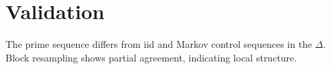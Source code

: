 \section{Validation}

The prime sequence differs from iid and Markov control sequences in the $\Delta$. Block resampling shows partial agreement, indicating local structure.
